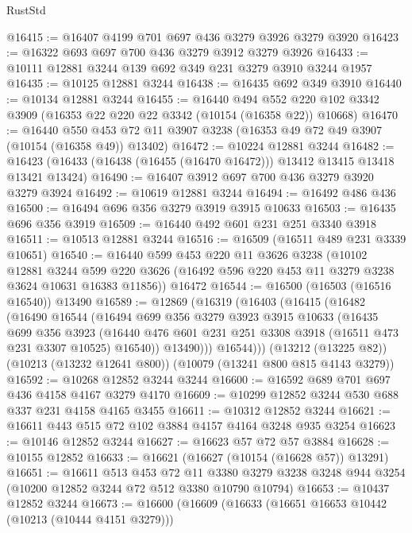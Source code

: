 \begin{lexlean}{RustStd}
\begin{coremodule}
{\begin{coremodule}
{{{{{{{{{{{{{{{{{{{{{{{{{{@16415 := @16407 @4199 @701 @697 @436 @3279 @3926 @3279 @3920
@16423 := @16322 @693 @697 @700 @436 @3279 @3912 @3279 @3926
@16433 := @10111 @12881 @3244 @139 @692 @349 @231 @3279 @3910 @3244 @1957
@16435 := @10125 @12881 @3244
@16438 := @16435 @692 @349 @3910
@16440 := @10134 @12881 @3244
@16455 := @16440
    @494
    @552
    @220
    @102
    @3342
    @3909
    (@16353 @22 @220 @22 @3342 (@10154 (@16358 @22)) @10668)
@16470 := @16440
    @550
    @453
    @72
    @11
    @3907
    @3238
    (@16353 @49 @72 @49 @3907 (@10154 (@16358 @49)) @13402)
@16472 := @10224 @12881 @3244
@16482 := @16423 (@16433 (@16438 (@16455 (@16470 @16472))) @13412 @13415 @13418 @13421 @13424)
@16490 := @16407 @3912 @697 @700 @436 @3279 @3920 @3279 @3924
@16492 := @10619 @12881 @3244
@16494 := @16492 @486 @436
@16500 := @16494 @696 @356 @3279 @3919 @3915 @10633
@16503 := @16435 @696 @356 @3919
@16509 := @16440 @492 @601 @231 @251 @3340 @3918
@16511 := @10513 @12881 @3244
@16516 := @16509 (@16511 @489 @231 @3339 @10651)
@16540 := @16440
    @599
    @453
    @220
    @11
    @3626
    @3238
    (@10102
      @12881
      @3244
      @599
      @220
      @3626
      (@16492 @596 @220 @453 @11 @3279 @3238 @3624 @10631 @16383 @11856))
    @16472
@16544 := @16500 (@16503 (@16516 @16540)) @13490
@16589 := @12869
    (@16319
      (@16403
        (@16415
          (@16482
            (@16490
              @16544
              (@16494
                @699
                @356
                @3279
                @3923
                @3915
                @10633
                (@16435
                  @699
                  @356
                  @3923
                  (@16440 @476 @601 @231 @251 @3308 @3918 (@16511 @473 @231 @3307 @10525) @16540))
                @13490)))
          @16544)))
    (@13212 (@13225 @82))
    (@10213 (@13232 @12641 @800))
    (@10079 (@13241 @800 @815 @4143 @3279))
@16592 := @10268 @12852 @3244 @3244
@16600 := @16592 @689 @701 @697 @436 @4158 @4167 @3279 @4170
@16609 := @10299 @12852 @3244 @530 @688 @337 @231 @4158 @4165 @3455
@16611 := @10312 @12852 @3244
@16621 := @16611 @443 @515 @72 @102 @3884 @4157 @4164 @3248 @935 @3254
@16623 := @10146 @12852 @3244
@16627 := @16623 @57 @72 @57 @3884
@16628 := @10155 @12852
@16633 := @16621 (@16627 (@10154 (@16628 @57)) @13291)
@16651 := @16611
    @513
    @453
    @72
    @11
    @3380
    @3279
    @3238
    @3248
    @944
    @3254
    (@10200 @12852 @3244 @72 @512 @3380 @10790 @10794)
@16653 := @10437 @12852 @3244
@16673 := @16600
    (@16609
      (@16633
        (@16651 @16653 @10442 (@10213 (@10444 @4151 @3279)))
}}}}}}}}}}}}}}}}}}}}}}}}}}
\end{coremodule}}
\end{coremodule}
\end{lexlean}
